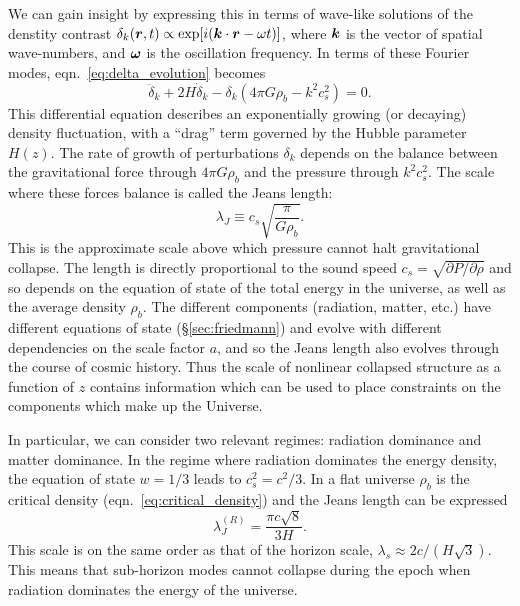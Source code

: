 We can gain insight by expressing this in terms of
wave-like solutions of the denstity contrast
$\delta_k(\boldsymbol{r}, t) \propto \exp[i(\boldsymbol{k}\cdot\boldsymbol{r} - \omega t)]$,
where $\boldsymbol{k}$ is the vector of spatial wave-numbers, and $\boldsymbol{\omega}$
is the oscillation frequency.  In terms of these Fourier modes,
eqn.~\ref{eq:delta_evolution} becomes
\begin{equation}
  \label{eq:delta_evolution_k}
  \ddot{\delta}_k + 2 H \dot{\delta}_k - \delta_k(4\pi G\rho_b - k^2c_s^2) = 0.
\end{equation}
This differential equation describes an exponentially growing (or decaying)
density fluctuation, with a ``drag'' term governed by the Hubble parameter
$H(z)$.  The rate of growth of perturbations $\delta_k$ depends
on the balance between the gravitational force through $4\pi G\rho_b$ and the
pressure through $k^2c_s^2$.  The scale where these forces balance
is called the Jeans length:
\begin{equation}
  \label{eq:jeans_length}
  \lambda_J \equiv c_s \sqrt{\frac{\pi}{G\rho_b}}.
\end{equation}
This is the approximate scale above which pressure cannot halt gravitational
collapse.  The length is directly proportional to the sound speed
$c_s = \sqrt{\partial P/\partial \rho}$ and so depends on the equation of
state of the total energy in the universe,
as well as the average density $\rho_b$.
The different components (radiation, matter, etc.) have different
equations of state (\S\ref{sec:friedmann}) and evolve
with different dependencies on the scale factor
$a$, and so the Jeans length also evolves through the course of cosmic
history.  Thus the scale of nonlinear
collapsed structure as a function of $z$ contains information which can
be used to place constraints on the components which make up the Universe.

In particular, we can consider two relevant regimes: radiation dominance
and matter dominance.  In the regime where radiation dominates the energy
density, the equation of state $w=1/3$ leads to $c_s^2 = c^2/3$.  In a flat
universe $\rho_b$ is the critical density (eqn.~\ref{eq:critical_density})
and the Jeans length can be expressed
\begin{equation}
  \label{eq:jeans_radiation}
  \lambda_J^{(R)} = \frac{\pi c \sqrt{8}}{3 H}.
\end{equation}
This scale is on the same order as that of the horizon scale,
$\lambda_s \approx 2c / (H\sqrt{3})$.  This means that sub-horizon modes
cannot collapse during the epoch when radiation dominates the energy
of the universe.

